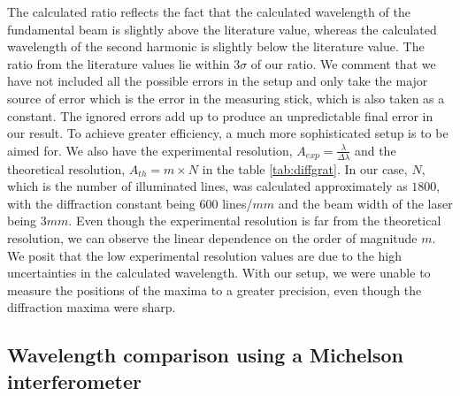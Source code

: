 The calculated ratio reflects the fact that the calculated wavelength of the fundamental beam is slightly above the literature value, whereas the calculated wavelength of the second harmonic is slightly below the literature value. The ratio from the literature values lie within $3\sigma$ of our ratio. We comment that we have not included all the possible errors in the setup and only take the major source of error which is the error in the measuring stick, which is also taken as a constant. The ignored errors add up to produce an unpredictable final error in our result. To achieve greater efficiency, a much more sophisticated setup is to be aimed for. We also have the experimental resolution, $A_{exp} = \frac{\lambda}{\Delta\lambda}$ and the theoretical resolution, $A_{th} = m \times N$ in the table \ref{tab:diffgrat}. In our case, $N$, which is the number of illuminated lines, was calculated approximately as $1800$, with the diffraction constant being $600$ lines/$mm$ and the beam width of the laser being $3mm$. Even though the experimental resolution is far from the theoretical resolution, we can observe the linear dependence on the order of magnitude $m$. We posit that the low experimental resolution values are due to the high uncertainties in the calculated wavelength. With our setup, we were unable to measure the positions of the maxima to a greater precision, even though the diffraction maxima were sharp.

\subsection{Wavelength comparison using a Michelson interferometer}

